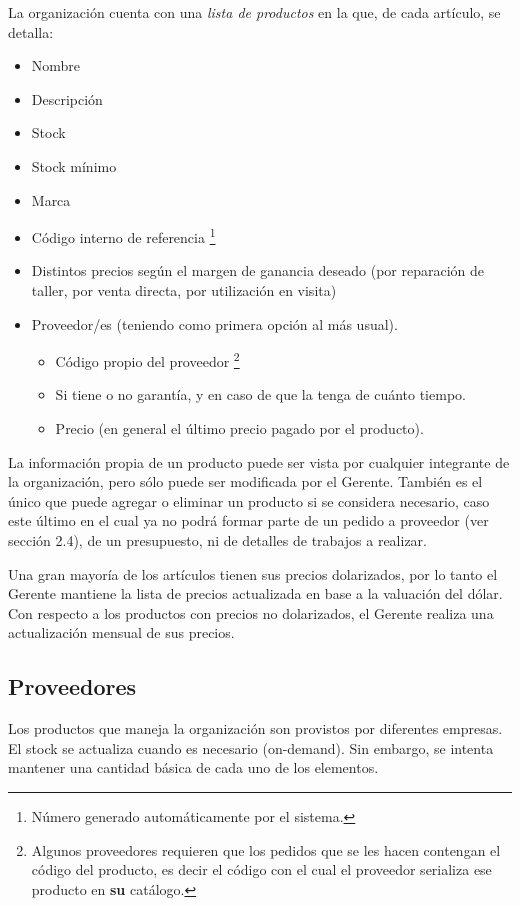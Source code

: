 \documentclass[12pt]{extarticle}
\begin{document}
\begin{spacing}{1.2}
    La organización cuenta con una \textit{lista de productos} en la que, de cada artículo, se detalla: 
    \begin{itemize}
        \item Nombre
        \item Descripción
    	\item Stock
    	\item Stock mínimo
        \item Marca
        \item Código interno de referencia \footnote{Número generado automáticamente por el sistema.}
        \item Distintos precios según el margen de ganancia deseado (por reparación de taller, por venta directa, por utilización en visita)
        \item Proveedor/es (teniendo como primera opción al más usual). 
		\begin{itemize}
	        \item Código propio del proveedor \footnote{Algunos proveedores requieren que los pedidos que se les hacen contengan el código del producto, es decir el código con el cual el proveedor serializa ese producto en \textbf{su} catálogo.}
    	    \item Si tiene o no garantía, y en caso de que la tenga de cuánto tiempo.
    	    \item Precio (en general el último precio pagado por el producto).
		\end{itemize}
    \end{itemize}

    La información propia de un producto puede ser vista por cualquier integrante de la organización, pero sólo puede ser modificada por el Gerente. También es el único que puede agregar o eliminar un producto si se considera necesario, caso este último en el cual ya no podrá formar parte de un pedido a proveedor (ver sección 2.4), de un presupuesto, ni de detalles de trabajos a realizar.
    
    Una gran mayoría de los artículos tienen sus precios dolarizados, por lo tanto el Gerente mantiene la lista de precios actualizada en base a la valuación del dólar. Con respecto a los productos con precios no dolarizados, el Gerente realiza una actualización mensual de sus precios.

    \subsection{Proveedores}
    Los productos que maneja la organización son provistos por diferentes empresas. El stock se actualiza cuando es necesario (on-demand). Sin embargo, se intenta mantener una cantidad básica de cada uno de los elementos.\\


\end{spacing}
\end{document}
